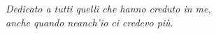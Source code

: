 \newpage\null\thispagestyle{empty}\newpage %
\thispagestyle{empty}
\begin{flushright}
\null{}
{\emph{Dedicato a tutti quelli che hanno creduto in me,\\ anche quando neanch'io ci credevo più.}}
\null
\end{flushright}